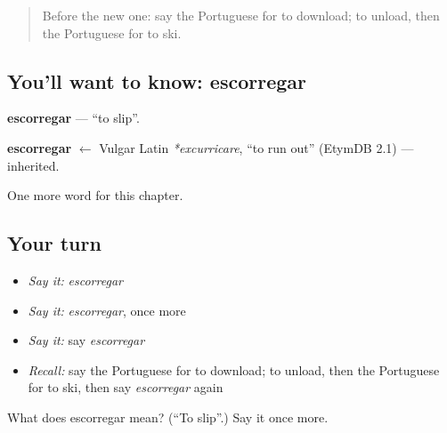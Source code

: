 \label{lesson:PT-C208-escorregar}



\begin{quote}
Before the new one: say the Portuguese for to download; to unload, then the Portuguese for to ski.
\end{quote}

\subsection*{You'll want to know: escorregar}
\textbf{escorregar} — \textquotedblleft{}to slip\textquotedblright{}.

\begin{cousinweb}
\textbf{escorregar} $\leftarrow$ Vulgar Latin \emph{*excurricare}, \textquotedblleft{}to run out\textquotedblright{} (EtymDB 2.1) — inherited.
\end{cousinweb}

\begin{grammarlens}[title={What you've built}]
One more word for this chapter.
\end{grammarlens}

\subsection*{Your turn}
\begin{itemize}
\raggedright
  \item \emph{Say it:} \emph{escorregar}
  \item \emph{Say it:} \emph{escorregar}, once more
  \item \emph{Say it:} say \emph{escorregar}
  \item \emph{Recall:} say the Portuguese for to download; to unload, then the Portuguese for to ski, then say \emph{escorregar} again
\end{itemize}

\begin{tcolorbox}[breakable,colback=teal!4,colframe=teal!35!black,title={Before you move on}]
What does escorregar mean? (\textquotedblleft{}To slip\textquotedblright{}.) Say it once more.
\end{tcolorbox}
